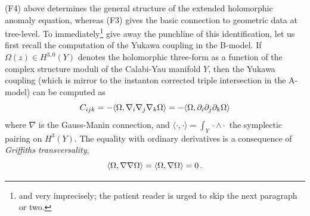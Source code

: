 (F4) above determines the general structure of the extended holomorphic
anomaly equation, whereas (F3) gives the basic connection to geometric data
at tree-level. To immediately\footnote{and very imprecisely; the patient reader
is urged to skip the next paragraph or two.} give away the punchline of this 
identification, let us first recall the computation of the Yukawa coupling in 
the B-model. If $\Omega(z)\in H^{3,0}(Y)$ denotes the holomorphic three-form 
as a function of the complex structure moduli of the Calabi-Yau manifold $Y$, 
then the Yukawa coupling (which is mirror to the instanton corrected triple 
intersection in the A-model) can be computed as
\begin{equation}
C_{ijk} = -\langle \Omega, \nabla_i\nabla_j\nabla_k \Omega\rangle
= -\langle \Omega,\partial_i\partial_j\partial_k\Omega\rangle
\end{equation}
where $\nabla$ is the Gauss-Manin connection, and $\langle\cdot,
\cdot\rangle=\int_Y \cdot\wedge\cdot$ the symplectic pairing on $H^3(Y)$.
The equality with ordinary derivatives is a consequence of {\it Griffiths 
transversality},
\begin{equation}
\eqlabel{transverse}
\langle \Omega,\nabla\nabla\Omega\rangle=\langle\Omega,\nabla\Omega\rangle=0 \,.
\end{equation}


